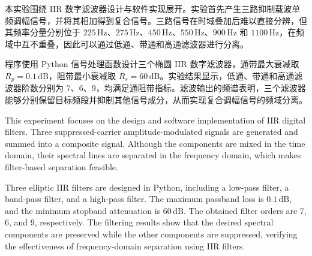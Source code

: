 \documentclass[bachelor,ktreport,openany,oneside,AutoFakeBold=true]{buaathesis}
\newcommand{\Hz}{\mathrm{Hz}}
\begin{document}


\pagestyle{mainmatter}
\maketitle

\pagestyle{frontmatter}
\begin{cabstract}
本实验围绕 IIR 数字滤波器设计与软件实现展开。实验首先产生三路抑制载波单频调幅信号，并将其相加得到复合信号。三路信号在时域叠加后难以直接分辨，但其频率分量分别位于 \(225\,\Hz\)、\(275\,\Hz\)、\(450\,\Hz\)、\(550\,\Hz\)、\(900\,\Hz\) 和 \(1100\,\Hz\)，在频域中互不重叠，因此可以通过低通、带通和高通滤波器进行分离。

程序使用 Python 信号处理函数设计三个椭圆 IIR 数字滤波器，通带最大衰减取 \(R_p=0.1\,\mathrm{dB}\)，阻带最小衰减取 \(R_s=60\,\mathrm{dB}\)。实验结果显示，低通、带通和高通滤波器阶数分别为 7、6、9，均满足通阻带指标。滤波输出的频谱表明，三个滤波器能够分别保留目标频段并抑制其他信号成分，从而实现复合调幅信号的频域分离。
\end{cabstract}

\begin{eabstract}
This experiment focuses on the design and software implementation of IIR digital filters. Three suppressed-carrier amplitude-modulated signals are generated and summed into a composite signal. Although the components are mixed in the time domain, their spectral lines are separated in the frequency domain, which makes filter-based separation feasible.

Three elliptic IIR filters are designed in Python, including a low-pass filter, a band-pass filter, and a high-pass filter. The maximum passband loss is \(0.1\,\mathrm{dB}\), and the minimum stopband attenuation is \(60\,\mathrm{dB}\). The obtained filter orders are 7, 6, and 9, respectively. The filtering results show that the desired spectral components are preserved while the other components are suppressed, verifying the effectiveness of frequency-domain separation using IIR filters.
\end{eabstract}
\end{document}
